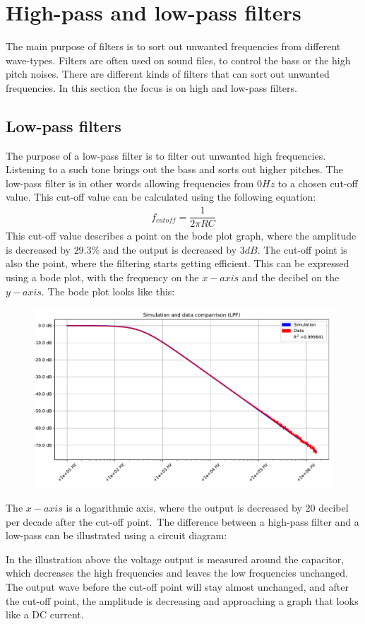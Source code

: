 \chapter{High-pass and low-pass filters}
The main purpose of filters is to sort out unwanted frequencies from different wave-types. Filters are often used on sound files, to control the bass or the high pitch noises. There are different kinds of filters that can sort out unwanted frequencies. In this section the focus is on high and low-pass filters.

\section{Low-pass filters}
The purpose of a low-pass filter is to filter out unwanted high frequencies. Listening to a such tone brings out the bass and sorts out higher pitches. The low-pass filter is in other words allowing frequencies from $0Hz$ to a chosen cut-off value. This cut-off value can be calculated using the following equation:
\begin{align*}
f_{cutoff}=\dfrac{1}{2 \pi RC}
\end{align*}
This cut-off value describes a point on the bode plot graph, where the amplitude is decreased by $29.3\%$ and the output is decreased by $3dB$. The cut-off point is also the point, where the filtering starts getting efficient. This can be expressed using a bode plot, with the frequency on the $x-axis$ and the decibel on the $y-axis$. The bode plot looks like this:
\begin{figure}[H]
\center
	\includegraphics[scale=0.7]{fig/img/bode_LPF_plot.pdf}
\end{figure}
The $x-axis$ is a logarithmic axis, where the output is decreased by 20 decibel per decade after the cut-off point.\
The difference between a high-pass filter and a low-pass can be illustrated using a circuit diagram:
\begin{figure}[H]
	
\end{figure}
In the illustration above the voltage output is measured around the capacitor, which decreases the high frequencies and leaves the low frequencies unchanged. The output wave before the cut-off point will stay almost unchanged, and after the cut-off point, the amplitude is decreasing and approaching a graph that looks like a DC current. 

